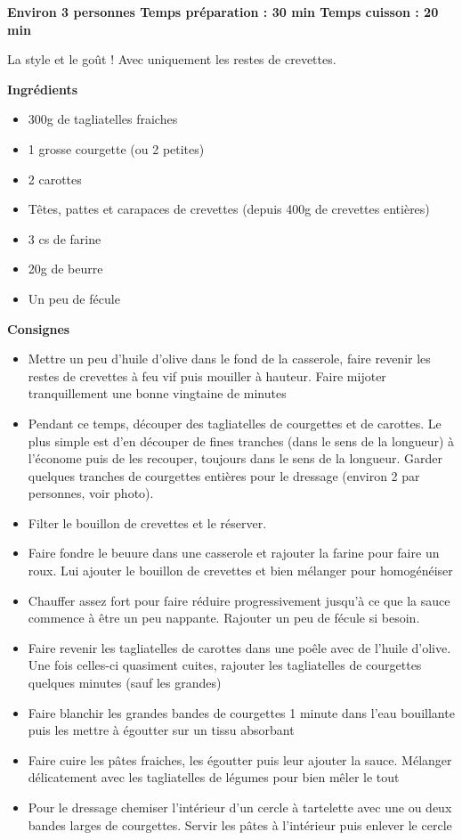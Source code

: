 \documentclass[]{book}
\providecommand{\tightlist}{%
  \setlength{\itemsep}{0pt}\setlength{\parskip}{0pt}}
\begin{document}
\begin{salebox}
\textbf{Environ 3 personnes \textbar{} Temps préparation : 30 min
\textbar{} Temps cuisson : 20 min}

La style et le goût ! Avec uniquement les restes de crevettes.
\end{salebox}

 \textbf{Ingrédients}

\begin{itemize}
\tightlist
\item
  300g de tagliatelles fraiches
\item
  1 grosse courgette (ou 2 petites)
\item
  2 carottes
\item
  Têtes, pattes et carapaces de crevettes (depuis 400g de crevettes
  entières)
\item
  3 cs de farine
\item
  20g de beurre
\item
  Un peu de fécule
\end{itemize}

\textbf{Consignes}

\begin{itemize}
\tightlist
\item
  Mettre un peu d'huile d'olive dans le fond de la casserole, faire
  revenir les restes de crevettes à feu vif puis mouiller à hauteur.
  Faire mijoter tranquillement une bonne vingtaine de minutes
\item
  Pendant ce temps, découper des tagliatelles de courgettes et de
  carottes. Le plus simple est d'en découper de fines tranches (dans le
  sens de la longueur) à l'économe puis de les recouper, toujours dans
  le sens de la longueur. Garder quelques tranches de courgettes
  entières pour le dressage (environ 2 par personnes, voir photo).
\item
  Filter le bouillon de crevettes et le réserver.
\item
  Faire fondre le beuure dans une casserole et rajouter la farine pour
  faire un roux. Lui ajouter le bouillon de crevettes et bien mélanger
  pour homogénéiser
\item
  Chauffer assez fort pour faire réduire progressivement jusqu'à ce que
  la sauce commence à être un peu nappante. Rajouter un peu de fécule si
  besoin.
\item
  Faire revenir les tagliatelles de carottes dans une poêle avec de
  l'huile d'olive. Une fois celles-ci quasiment cuites, rajouter les
  tagliatelles de courgettes quelques minutes (sauf les grandes)
\item
  Faire blanchir les grandes bandes de courgettes 1 minute dans l'eau
  bouillante puis les mettre à égoutter sur un tissu absorbant
\item
  Faire cuire les pâtes fraiches, les égoutter puis leur ajouter la
  sauce. Mélanger délicatement avec les tagliatelles de légumes pour
  bien mêler le tout
\item
  Pour le dressage chemiser l'intérieur d'un cercle à tartelette avec
  une ou deux bandes larges de courgettes. Servir les pâtes à
  l'intérieur puis enlever le cercle
\end{itemize}
\end{document}

